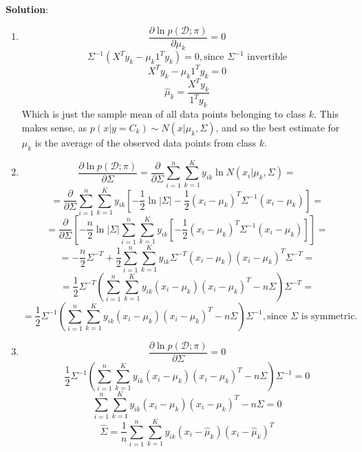 \documentclass[submit]{../harvardml}
\newenvironment{solution}{
    \vspace{2mm}
    \color{blue}\noindent\textbf{Solution}:
}{}
\begin{document}
\begin{solution}
\begin{enumerate}
        \item $$\frac{\partial \ln p(\mathcal{D} ; \pi)}{\partial \mu_k} = 0$$
        $$ \Sigma^{-1}(X^Ty_k - \mu_k1^Ty_k) = 0, \text{since $\Sigma^{-1}$ invertible}$$
        $$X^Ty_k - \mu_k1^Ty_k = 0$$
        $$\hat \mu_k = \frac{X^Ty_k}{1^Ty_k}$$
        Which is just the sample mean of all data points belonging to class $k$. This makes sense, as $p(x|y=C_k) \sim N(x|\mu_k, \Sigma)$, and so the best estimate for $\mu_k$ is the average of the observed data points from class $k$.
        \item $$\frac{\partial \ln p(\mathcal{D} ; \pi)}{\partial \Sigma} =\frac{\partial }{\partial \Sigma} \sum_{i = 1}^n\sum_{k = 1}^Ky_{ik}\ln N(x_i|\mu_{k}, \Sigma)=$$
        $$=\frac{\partial }{\partial \Sigma} \sum_{i = 1}^n\sum_{k = 1}^Ky_{ik}[-\frac{1}{2}\ln |\Sigma| - \frac{1}{2}(x_i - \mu_k)^T\Sigma^{-1}(x_i - \mu_k)]=$$
        $$=\frac{\partial }{\partial \Sigma} [-\frac{n}{2}\ln |\Sigma| \sum_{i = 1}^n\sum_{k = 1}^Ky_{ik}[- \frac{1}{2}(x_i - \mu_k)^T\Sigma^{-1}(x_i - \mu_k)]]=$$
        $$=-\frac{n}{2}\Sigma^{-T} +  \frac{1}{2}\sum_{i = 1}^n\sum_{k = 1}^Ky_{ik}\Sigma^{-T}(x_i - \mu_k)(x_i - \mu_k)^T\Sigma^{-T}=$$
        $$=\frac{1}{2}\Sigma^{-T} (\sum_{i = 1}^n\sum_{k = 1}^Ky_{ik}(x_i - \mu_k)(x_i - \mu_k)^T - n\Sigma)\Sigma^{-T}=$$
        $$=\frac{1}{2}\Sigma^{-1} (\sum_{i = 1}^n\sum_{k = 1}^Ky_{ik}(x_i - \mu_k)(x_i - \mu_k)^T - n\Sigma)\Sigma^{-1}, \text{since $\Sigma$ is symmetric.}$$
        \item $$\frac{\partial \ln p(\mathcal{D} ; \pi)}{\partial \Sigma} = 0$$
        $$\frac{1}{2}\Sigma^{-1} (\sum_{i = 1}^n\sum_{k = 1}^Ky_{ik}(x_i - \mu_k)(x_i - \mu_k)^T - n\Sigma)\Sigma^{-1} = 0$$
        $$\sum_{i = 1}^n\sum_{k = 1}^Ky_{ik}(x_i - \mu_k)(x_i - \mu_k)^T - n\Sigma = 0$$
        $$\hat \Sigma = \frac{1}{n}\sum_{i = 1}^n\sum_{k = 1}^Ky_{ik}(x_i - \hat \mu_k)(x_i - \hat \mu_k)^T$$
	\end{enumerate}
\end{solution}

\newpage
\end{document}
